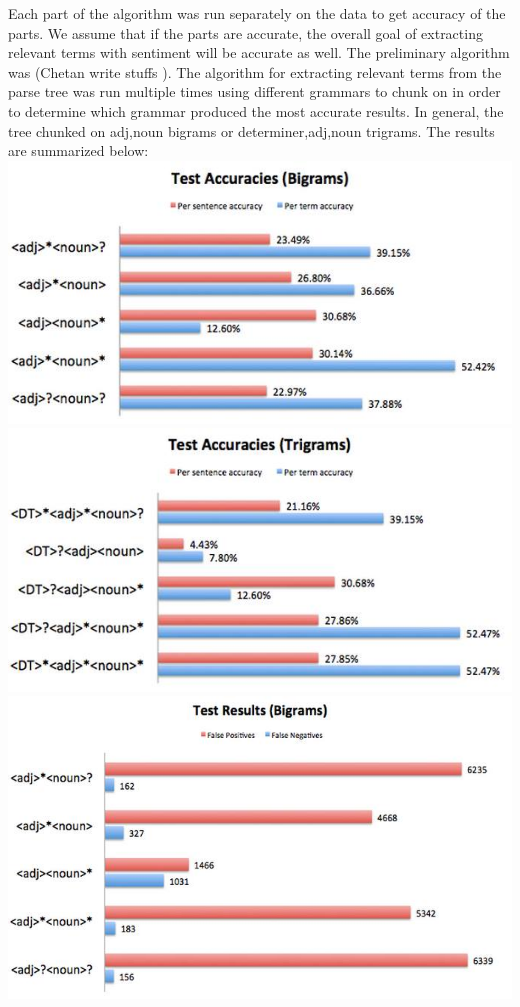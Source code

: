 \documentclass{article}
\begin{document}
Each part of the algorithm was run separately on the data to get accuracy of the parts. We assume that if the parts are accurate, the overall goal of extracting relevant terms with sentiment will be accurate as well.
The preliminary algorithm was (Chetan write stuffs ). 
\newline 
The algorithm for extracting relevant terms from the parse tree was run multiple times using different grammars to chunk on in order to determine which grammar produced the most accurate results. In general, the tree chunked on adj,noun bigrams or determiner,adj,noun trigrams. The results are summarized below: \\
\includegraphics[scale = 0.4]{bigramsAcc.jpg}
\includegraphics[scale = 0.4]{trigramsAcc.jpg}
\includegraphics[scale = 0.35]{bigramsFalse.jpg}
\end{document}
